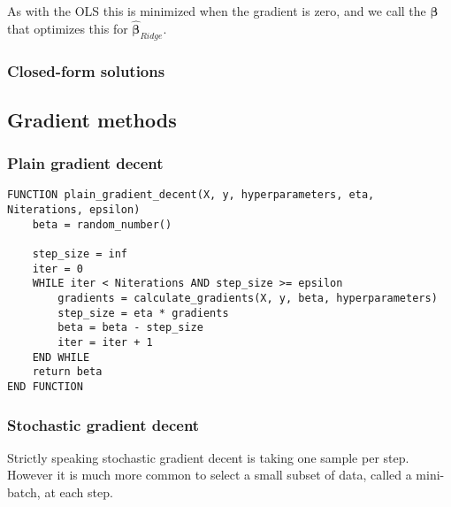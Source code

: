 As with the OLS this is minimized when the gradient is zero, and we call the $\boldsymbol\beta$ that optimizes this for $\hat{\boldsymbol\beta}_{Ridge}$. 

\subsubsection{Closed-form solutions}
\begin{comment}
Both the OLS- and Ridge-methods have closed-form analytical solutions. 
These can easily be found by deriving the cost function with respect to $\boldsymbol{\beta}$. 
\end{comment}

\subsection{Gradient methods}

\subsubsection{Plain gradient decent}
\begin{lstlisting}
FUNCTION plain_gradient_decent(X, y, hyperparameters, eta, Niterations, epsilon)
	beta = random_number()

	step_size = inf
	iter = 0
	WHILE iter < Niterations AND step_size >= epsilon
		gradients = calculate_gradients(X, y, beta, hyperparameters)
		step_size = eta * gradients
		beta = beta - step_size
		iter = iter + 1
	END WHILE
	return beta
END FUNCTION
\end{lstlisting}





\subsubsection{Stochastic gradient decent}
Strictly speaking stochastic gradient decent is taking one sample per step. 
However it is much more common to select a small subset of data, called a
mini-batch, at each step.






